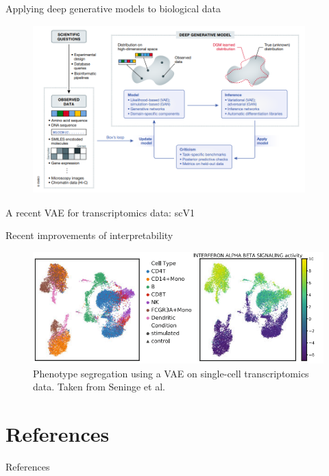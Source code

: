 \documentclass{beamer}					%
\begin{document}
\begin{frame}{Applying deep generative models to biological data}
\begin{figure}
\includegraphics[height=65mm, width=105mm]{dbm}
\end{figure}
\end{frame}

\begin{frame}{A recent VAE for transcriptomics data: scV1}

\end{frame}


\begin{frame}{Recent improvements of interpretability}

\begin{figure}
\begin{center}
\includegraphics[width=1.0\textwidth]{immune}
\end{center}
\caption{Phenotype segregation using a VAE on single-cell transcriptomics data. Taken from Seninge et al.}
\end{figure}

\end{frame}




\section{References}

\begin{frame}[allowframebreaks]{References}
	\tiny
	
\end{frame}
\end{document}
